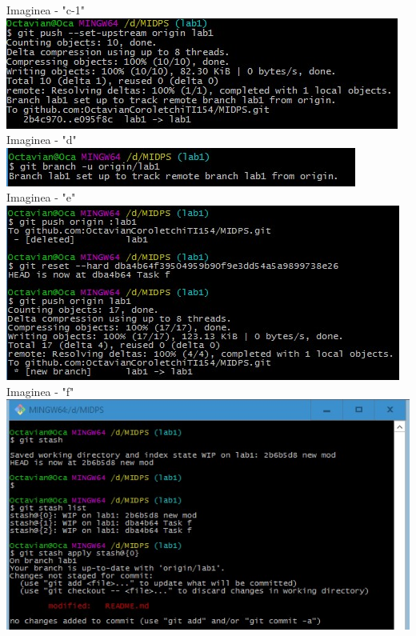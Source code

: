 \begin{center}
Imaginea - "c-1" \\
\vspace{10 mm}
\includegraphics[scale=1]{d} \\
Imaginea - "d" \\
\vspace{10 mm}
\includegraphics[scale=1]{e} \\ 
Imaginea - "e" \\
\vspace{10 mm}
\includegraphics[scale=1]{f} \\ 
Imaginea - "f" \\
\vspace{10 mm}
\includegraphics[scale=1]{g} \\

\end{center}
